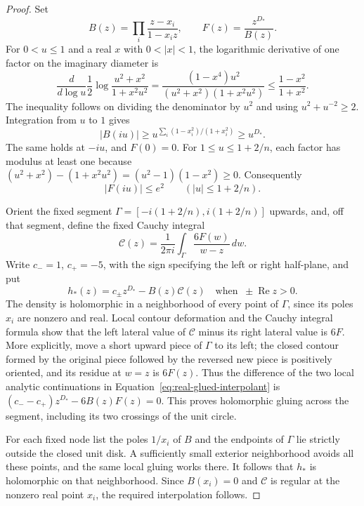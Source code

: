 \begin{proof}
Set
\[
 B(z)=\prod_i\frac{z-x_i}{1-x_i z},\qquad
 F(z)=\frac{z^{D_*}}{B(z)}.
\]
For $0<u\le1$ and a real $x$ with $0<|x|<1$, the logarithmic
derivative of one factor on the imaginary diameter is
\[
 \frac{d}{d\log u}\frac12\log\frac{u^2+x^2}{1+x^2u^2}
 =\frac{(1-x^4)u^2}{(u^2+x^2)(1+x^2u^2)}
 \le\frac{1-x^2}{1+x^2}.
\]
The inequality follows on dividing the denominator by $u^2$ and
using $u^2+u^{-2}\ge2$.  Integration from $u$ to $1$ gives
\[
 |B(iu)|\ge u^{\sum_i(1-x_i^2)/(1+x_i^2)}\ge u^{D_*}.
\]
The same holds at $-iu$, and $F(0)=0$.  For $1\le u\le1+2/n$,
each factor has modulus at least one because
$(u^2+x^2)-(1+x^2u^2)=(u^2-1)(1-x^2)\ge0$.
Consequently
\begin{equation}\label{eq:real-diameter-bound}
 |F(iu)|\le e^2\qquad (|u|\le1+2/n).
\end{equation}

Orient the fixed segment $\Gamma=[-i(1+2/n),i(1+2/n)]$ upwards,
and, off that segment, define the fixed Cauchy integral
\[
 \mathcal C(z)=\frac1{2\pi i}\int_\Gamma\frac{6F(w)}{w-z}\,dw.
\]
Write $c_-=1$, $c_+=-5$, with the sign specifying the left or right
half-plane, and put
\begin{equation}\label{eq:real-glued-interpolant}
 h_*(z)=c_\pm z^{D_*}-B(z)\mathcal C(z)
 \quad\text{when }\ \pm\operatorname{Re}z>0.
\end{equation}
The density is holomorphic in a neighborhood of every point of
$\Gamma$, since its poles $x_i$ are nonzero and real.  Local contour
deformation and the Cauchy integral formula show that the left lateral
value of $\mathcal C$ minus its right lateral value is $6F$.
More explicitly, move a short upward piece of $\Gamma$ to its left;
the closed contour formed by the original piece followed by the reversed
new piece is positively oriented, and its residue at $w=z$ is $6F(z)$.
Thus the difference of the two local analytic continuations in
Equation~\eqref{eq:real-glued-interpolant} is
$(c_--c_+)z^{D_*}-6B(z)F(z)=0$.  This proves holomorphic gluing
across the segment, including its two crossings of the unit circle.

For each fixed node list the poles $1/x_i$ of $B$ and the endpoints
of $\Gamma$ lie strictly outside the closed unit disk.  A sufficiently
small exterior neighborhood avoids all these points, and the same local
gluing works there.  It follows that $h_*$ is holomorphic on that
neighborhood.  Since $B(x_i)=0$ and $\mathcal C$ is regular at the
nonzero real point $x_i$, the required interpolation follows.


\end{proof}
